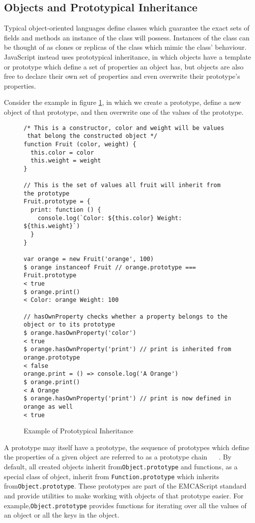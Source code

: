 \documentclass[]{final_report}
\begin{document}
\subsection{Objects and Prototypical Inheritance}
Typical object-oriented languages define classes which guarantee the exact sets of fields and methods an instance of the class will possess. Instances of the class can be thought of as clones or replicas of the class which mimic the class' behaviour. JavaScript instead uses prototypical inheritance, in which objects have a template or prototype which define a set of properties an object has, but objects are also free to declare their own set of properties and even overwrite their prototype's properties. 

Consider the example in figure \ref{fig:js-prototypical-inheritance}, in which we create a prototype, define a new object of that prototype, and then overwrite one of the values of the prototype.

\begin{figure}[h]
\begin{verbatim}
/* This is a constructor, color and weight will be values
 that belong the constructed object */
function Fruit (color, weight) {
  this.color = color
  this.weight = weight
}

// This is the set of values all fruit will inherit from the prototype
Fruit.prototype = {
  print: function () {
    console.log(`Color: ${this.color} Weight: ${this.weight}`)
  }
}

var orange = new Fruit('orange', 100)
$ orange instanceof Fruit // orange.prototype === Fruit.prototype
< true
$ orange.print()
< Color: orange Weight: 100

// hasOwnProperty checks whether a property belongs to the object or to its prototype
$ orange.hasOwnProperty('color') 
< true
$ orange.hasOwnProperty('print') // print is inherited from orange.prototype
< false
orange.print = () => console.log('A Orange')
$ orange.print()
< A Orange
$ orange.hasOwnProperty('print') // print is now defined in orange as well
< true
\end{verbatim}
\caption{\label{fig:js-prototypical-inheritance} Example of Prototypical Inheritance}
\end{figure} 

A prototype may itself have a prototype, the sequence of prototypes which define the properties of a given object are referred to as a prototype chain ~\cite{EcmaScript}~ \cite{borning1986classes}.  By default, all created objects inherit from\lstinline{Object.prototype} and functions, as a special class of object, inherit from \lstinline{Function.prototype} which inherits from\lstinline{Object.prototype}. These prototypes are part of the EMCAScript standard and provide utilities to make working with objects of that prototype easier. For example,\lstinline{Object.prototype} provides functions for iterating over all the values of an object or all the keys in the object.
\end{document}
